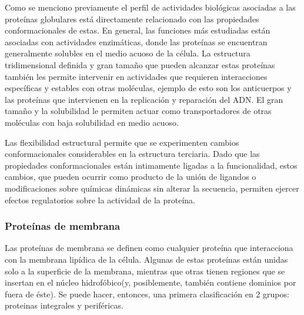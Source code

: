 Como se menciono previamente el perfil de actividades biológicas asociadas a las proteínas globulares está directamente relacionado con las propiedades conformacionales de estas.
En general, las funciones más estudiadas están asociadas con actividades enzimáticas, donde las proteínas se encuentran generalmente solubles en el medio acuoso de la célula.
La estructura tridimensional definida y gran tamaño que pueden alcanzar estas proteínas también les permite intervenir en actividades que requieren interacciones específicas y estables con otras moléculas, 
ejemplo de esto son los anticuerpos y las proteínas que intervienen en la replicación y reparación del ADN.
El gran tamaño y la solubilidad le permiten actuar como transportadores de otras moléculas con baja solubilidad en medio acuoso.

Las flexibilidad estructural permite que se experimenten cambios conformacionales considerables en la estructura terciaria. 
Dado que las propiedades conformacionales están intimamente ligadas a la funcionalidad, estos cambios, 
que pueden ocurrir como producto de la unión de ligandos o modificaciones sobre químicas dinámicas sin alterar la secuencia, permiten ejercer efectos regulatorios sobre la actividad de la proteína.






% 
% 
% 















\subsubsection{Proteínas de membrana}
Las proteínas de membrana se definen como cualquier proteína que interacciona con la membrana lipídica de la célula.
Algunas de estas proteínas están unidas solo a la superficie de la membrana, mientras que otras tienen regiones que se insertan en el núcleo hidrofóbico(y, posiblemente, también contiene dominios por fuera de éste). 
Se puede hacer, entonces, una primera clasificación en 2 grupos: proteinas integrales y periféricas.

